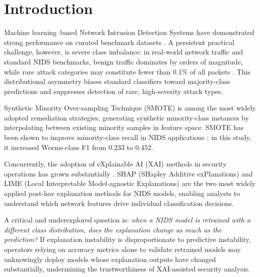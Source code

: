 \documentclass[conference,a4paper]{IEEEtran}
\newcommand{\NIDS}{NIDS\xspace}
\newcommand{\SMOTE}{SMOTE\xspace}
\newcommand{\XAI}{XAI\xspace}
\begin{document}
\section{Introduction}

Machine learning--based Network Intrusion Detection Systems have demonstrated
strong performance on curated benchmark datasets \cite{alshamy2021,wu2022,more2024}.
A persistent practical challenge, however, is severe class imbalance: in
real-world network traffic and standard \NIDS benchmarks, benign traffic dominates
by orders of magnitude, while rare attack categories may constitute fewer than 0.1\%
of all packets \cite{moustafa2015,shanmugam2025}. This distributional asymmetry
biases standard classifiers toward majority-class predictions and suppresses
detection of rare, high-severity attack types.

Synthetic Minority Over-sampling Technique (\SMOTE) \cite{chawla2002} is among
the most widely adopted remediation strategies, generating synthetic minority-class
instances by interpolating between existing minority samples in feature space.
\SMOTE has been shown to improve minority-class recall in \NIDS
applications \cite{alshamy2021,sayegh2024}; in this study, it increased Worms-class
F1 from 0.233 to 0.452.

Concurrently, the adoption of eXplainable AI (\XAI) methods in security
operations has grown substantially \cite{charmet2022,rjoub2023}. SHAP
(SHapley Additive exPlanations) \cite{lundberg2017,lundberg2020} and LIME
(Local Interpretable Model-agnostic Explanations) \cite{ribeiro2016,gaspar2024,hermosilla2025a}
are the two most widely applied post-hoc explanation methods for \NIDS models,
enabling analysts to understand which network features drive individual
classification decisions.

A critical and underexplored question is: \emph{when a \NIDS model is retrained
with a different class distribution, does the explanation change as much as the
prediction?} If explanation instability is disproportionate to predictive
instability, operators relying on accuracy metrics alone to validate retrained
models may unknowingly deploy models whose explanation outputs have changed
substantially, undermining the trustworthiness of \XAI-assisted security analysis.
\end{document}
